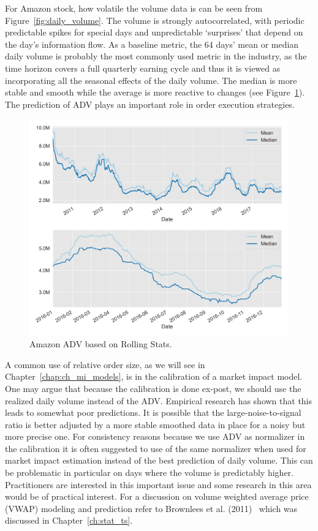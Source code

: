 For Amazon stock, how volatile the volume data is can be seen from Figure~\ref{fig:daily_volume}. The volume is strongly autocorrelated, with periodic predictable spikes for special days and unpredictable `surprises' that depend on the day's information flow. As a baseline metric, the 64 days' mean or median daily volume is probably the most commonly used metric in the industry, as the time horizon covers a full quarterly earning cycle and thus it is viewed as incorporating all the seasonal effects of the daily volume. The median is more stable and smooth while the average is more reactive to changes (see Figure~\ref{fig:amazon_adv}). The prediction of ADV plays an important role in order execution strategies. 
	\begin{figure}[!ht]
	\centering
	\includegraphics[width=\textwidth]{chapters/chapter_trade_data_models/figures/adv.png} 
	\caption{Amazon ADV based on Rolling Stats.\label{fig:amazon_adv}}
	\end{figure}


 A common use of relative order size, as we will see in Chapter~\ref{chap:ch_mi_models}, is in the calibration of a market impact model. One may argue that because the calibration is done ex-post, we should use the realized daily volume instead of the ADV. Empirical research has shown that this leads to somewhat poor predictions. It is possible that the large-noise-to-signal ratio is better adjusted by a more stable smoothed data in place for a noisy but more precise one. For consistency reasons because we use ADV as normalizer in the calibration it is often suggested to use of the same normalizer when used for market impact estimation instead of the best prediction of daily volume. This can be problematic in particular on days where the volume is predictably higher. Practitioners are interested in this important issue and some research in this area would be of practical interest. For a discussion on volume weighted average price (VWAP) modeling and prediction refer to Brownlees et al. (2011)~\cite{brownless} which was discussed in Chapter~\ref{ch:stat_ts}.



